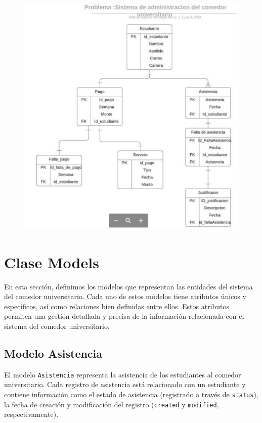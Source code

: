 \documentclass{article}
\begin{document}
\begin{figure}[H]
			\centering
			\includegraphics[scale=0.3]{img/Diagrama_ER_borrador.jpeg} 
		\end{figure}


\section{Clase Models}

En esta sección, definimos los modelos que representan las entidades del sistema del comedor universitario. Cada uno de estos modelos tiene atributos únicos y específicos, así como relaciones bien definidas entre ellos. Estos atributos permiten una gestión detallada y precisa de la información relacionada con el sistema del comedor universitario.

\subsection{Modelo Asistencia}

El modelo \texttt{Asistencia} representa la asistencia de los estudiantes al comedor universitario. Cada registro de asistencia está relacionado con un estudiante y contiene información como el estado de asistencia (registrado a través de \texttt{status}), la fecha de creación y modificación del registro (\texttt{created} y \texttt{modified}, respectivamente).
\end{document}
